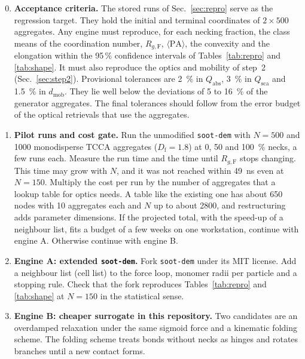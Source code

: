 \documentclass[11pt,a4paper]{article}
\newcommand{\Df}{D_\text{f}}
\begin{document}
\begin{enumerate}
  \setcounter{enumi}{-1}
  \item \textbf{Acceptance criteria.}
        The stored runs of Sec.~\ref{sec:repro} serve as the regression target.
        They hold the initial and terminal coordinates of $2 \times 500$ aggregates.
        Any engine must reproduce, for each necking fraction, the class means of the coordination number, $R_{g,\text{F}}$, $\langle\text{PA}\rangle$, the convexity and the elongation within the 95\,\% confidence intervals of Tables~\ref{tab:repro} and \ref{tab:shape}.
        It must also reproduce the optics and mobility of step~2 (Sec.~\ref{sec:step2}).
        Provisional tolerances are \SI{2}{\percent} in $Q_\text{abs}$, \SI{3}{\percent} in $Q_\text{sca}$ and \SI{1.5}{\percent} in $d_\text{mob}$.
        They lie well below the deviations of 5 to \SI{16}{\percent} of the generator aggregates.
        The final tolerances should follow from the error budget of the optical retrievals that use the aggregates.
  \item \textbf{Pilot runs and cost gate.}
        Run the unmodified \texttt{soot-dem} with $N = 500$ and 1000 monodisperse TCCA aggregates ($\Df = 1.8$) at 0, 50 and \SI{100}{\percent} necks, a few runs each.
        Measure the run time and the time until $R_{g,\text{F}}$ stops changing.
        This time may grow with $N$, and it was not reached within \SI{49}{\nano\second} even at $N = 150$.
        Multiply the cost per run by the number of aggregates that a lookup table for optics needs.
        A table like the existing one has about 650 nodes with 10 aggregates each and $N$ up to about 2800, and restructuring adds parameter dimensions.
        If the projected total, with the speed-up of a neighbour list, fits a budget of a few weeks on one workstation, continue with engine A.
        Otherwise continue with engine B.
  \item[2A.] \textbf{Engine A: extended \texttt{soot-dem}.}
        Fork \texttt{soot-dem} under its MIT license.
        Add a neighbour list (cell list) to the force loop, monomer radii per particle and a stopping rule.
        Check that the fork reproduces Tables~\ref{tab:repro} and \ref{tab:shape} at $N = 150$ in the statistical sense.
  \item[2B.] \textbf{Engine B: cheaper surrogate in this repository.}
        Two candidates are an overdamped relaxation under the same sigmoid force and a kinematic folding scheme.
        The folding scheme treats bonds without necks as hinges and rotates branches until a new contact forms.

\end{enumerate}
\end{document}
